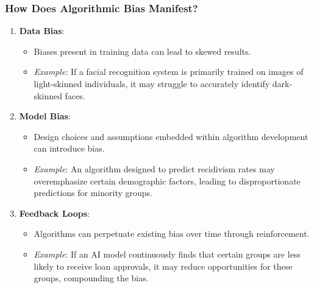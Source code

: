 \documentclass[aspectratio=169]{beamer}
\begin{document}
\begin{frame}[fragile]
    \frametitle{How Does Algorithmic Bias Manifest?}
    \begin{enumerate}
        \item \textbf{Data Bias}:
            \begin{itemize}
                \item Biases present in training data can lead to skewed results.
                \item \textit{Example}: If a facial recognition system is primarily trained on images of light-skinned individuals, it may struggle to accurately identify dark-skinned faces.
            \end{itemize}
    
        \item \textbf{Model Bias}:
            \begin{itemize}
                \item Design choices and assumptions embedded within algorithm development can introduce bias.
                \item \textit{Example}: An algorithm designed to predict recidivism rates may overemphasize certain demographic factors, leading to disproportionate predictions for minority groups.
            \end{itemize}
    
        \item \textbf{Feedback Loops}:
            \begin{itemize}
                \item Algorithms can perpetuate existing bias over time through reinforcement.
                \item \textit{Example}: If an AI model continuously finds that certain groups are less likely to receive loan approvals, it may reduce opportunities for these groups, compounding the bias.
            \end{itemize}
    \end{enumerate}
\end{frame}
\end{document}
